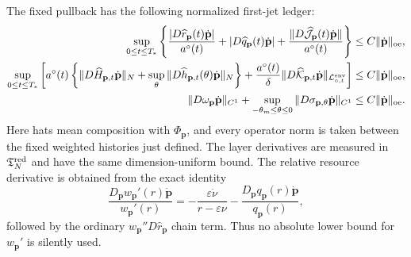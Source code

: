 \begin{lemma}
The fixed pullback has the following normalized first-jet ledger:
\begin{align}
 \sup_{0\le t\le T_*}\left\{
 \frac{|D\widehat r_{\mathbf p}(t)\dot{\mathbf p}|}{a^\circ(t)}
 +|D\widehat q_{\mathbf p}(t)\dot{\mathbf p}|
 +\frac{\|D\widehat{\mathcal J}_{\mathbf p}(t)
                   \dot{\mathbf p}\|}{a^\circ(t)}
 \right\}
 &\le C\|\dot{\mathbf p}\|_{\rm oe},\notag\\
 \sup_{0\le t\le T_*}\left[
 a^\circ(t)\left\{\|D\widehat H_{\mathbf p,t}
                   \dot{\mathbf p}\|_N
       +\sup_\theta\|D\widehat h_{\mathbf p,t}
                   (\theta)\dot{\mathbf p}\|_N\right\}
 +\frac{a^\circ(t)}{\delta}
       \|D\widehat{\mathcal K}_{\mathbf p,t}
                   \dot{\mathbf p}\|_
       {\mathcal L_{\circ,t}^{\rm env}}
 \right]
 &\le C\|\dot{\mathbf p}\|_{\rm oe},\notag\\
 \|D\omega_{\mathbf p}\dot{\mathbf p}\|_{C^1}
 +\sup_{-\theta_m\le\theta\le0}
   \|D\sigma_{\mathbf p,\theta}
                   \dot{\mathbf p}\|_{C^1}
 &\le C\|\dot{\mathbf p}\|_{\rm oe}.           \label{eq:oe-fixed-action-coefficient-jet-ledger}
\end{align}
Here hats mean composition with \(\Phi_{\mathbf p}\), and every
operator norm is taken between the fixed weighted histories just
defined.  The layer derivatives are measured in
\(\mathfrak T_N^{\rm red}\) and have the same dimension-uniform bound.
The relative resource derivative is obtained from the exact identity
\begin{equation}
 \frac{D_{\mathbf p}w_{\mathbf p}'(r)
             \dot{\mathbf p}}{w_{\mathbf p}'(r)}
 =-\frac{\varepsilon\dot\nu}{r-\varepsilon\nu}
   -\frac{D_{\mathbf p}q_{\mathbf p}(r)
             \dot{\mathbf p}}{q_{\mathbf p}(r)},           \label{eq:oe-fixed-action-resource-relative-jet}
\end{equation}
followed by the ordinary \(w_{\mathbf p}''D\widehat r_{\mathbf p}\)
chain term.  Thus no absolute lower bound for \(w_{\mathbf p}'\) is
silently used.


\end{lemma}
